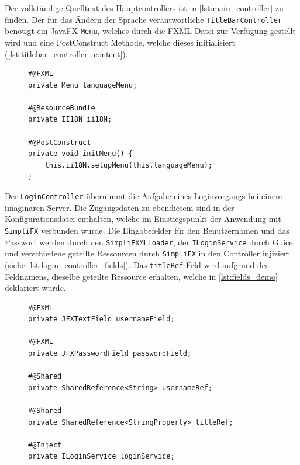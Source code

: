 \noindent Der vollständige Quelltext des Hauptcontrollers ist in \autoref{lst:main_controller} zu finden.
\noindent Der für das Ändern der Sprache verantwortliche \texttt{TitleBarController} benötigt ein JavaFX \texttt{Menu}, welches durch die FXML Datei zur Verfügung gestellt wird und eine PostConstruct Methode, welche dieses initialisiert (\autoref{lst:titlebar_controller_content}).
\begin{figure}[H]
	\begin{lstlisting}[caption=Demo -- Felder und Methoden im \texttt{TitleBarController}., captionpos=b, label=lst:titlebar_controller_content]
#@FXML
private Menu languageMenu;

#@ResourceBundle
private II18N ii18N;

#@PostConstruct
private void initMenu() {
    this.ii18N.setupMenu(this.languageMenu);
}
	\end{lstlisting}
\end{figure}
\noindent Der \texttt{LoginController} übernimmt die Aufgabe eines Loginvorgangs bei einem imaginären Server. Die Zugangsdaten zu ebendiesem sind in der Konfigurationsdatei enthalten, welche im Einstiegspunkt der Anwendung mit \texttt{SimpliFX} verbunden wurde. Die Eingabefelder für den Benutzernamen und das Passwort werden durch den \texttt{SimpliFXMLLoader}, der \texttt{ILoginService} durch Guice und verschiedene geteilte Ressourcen durch \texttt{SimpliFX} in den Controller injiziert (siehe \autoref{lst:login_controller_fields}). Das \texttt{titleRef} Feld wird aufgrund des Feldnamens, dieselbe geteilte Ressource erhalten, welche in \autoref{lst:fields_demo} deklariert wurde.
\begin{figure}[H]
	\begin{lstlisting}[caption=Demo -- Injizierte Felder des \texttt{LoginController}s., captionpos=b, label=lst:login_controller_fields]
#@FXML
private JFXTextField usernameField;

#@FXML
private JFXPasswordField passwordField;

#@Shared
private SharedReference<String> usernameRef;

#@Shared
private SharedReference<StringProperty> titleRef;

#@Inject
private ILoginService loginService;
	\end{lstlisting}
\end{figure}
